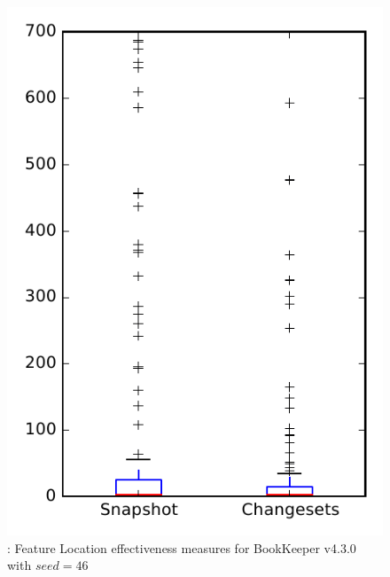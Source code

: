 
\begin{figure}
\centering
\includegraphics[height=0.4\textheight]{figures/flt_seed/rq1_bookkeeper_46}
\caption{\rone: Feature Location effectiveness measures for BookKeeper v4.3.0 with $seed=46$}
\label{fig:flt_seed:rq1:bookkeeper}
\end{figure}
